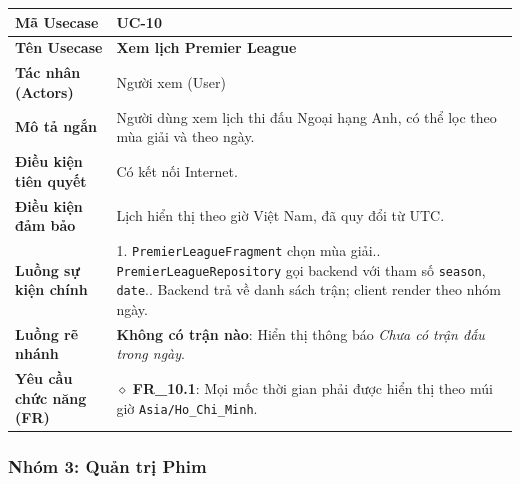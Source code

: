 \begin{table}[H]
\renewcommand{\arraystretch}{1.3}
\centering
\begin{tabularx}{\textwidth}{|p{4.5cm}|X|}
\hline
\cellcolor{gray!15}\bfseries Mã Usecase & \textbf{UC-10} \\ \hline
\cellcolor{gray!15}\bfseries Tên Usecase & \textbf{Xem lịch Premier League} \\ \hline
\cellcolor{gray!15}\bfseries Tác nhân (Actors) & Người xem (User) \\ \hline
\cellcolor{gray!15}\bfseries Mô tả ngắn & Người dùng xem lịch thi đấu Ngoại hạng Anh, có thể lọc theo mùa giải và theo ngày. \\ \hline
\cellcolor{gray!15}\bfseries Điều kiện tiên quyết & Có kết nối Internet. \\ \hline
\cellcolor{gray!15}\bfseries Điều kiện đảm bảo & Lịch hiển thị theo giờ Việt Nam, đã quy đổi từ UTC. \\ \hline
\cellcolor{gray!15}\bfseries Luồng sự kiện chính & 1. \texttt{PremierLeagueFragment} chọn mùa giải.\newline 2. \texttt{PremierLeagueRepository} gọi backend với tham số \texttt{season}, \texttt{date}.\newline 3. Backend trả về danh sách trận; client render theo nhóm ngày. \\ \hline
\cellcolor{gray!15}\bfseries Luồng rẽ nhánh & \textbf{Không có trận nào}: Hiển thị thông báo \textit{Chưa có trận đấu trong ngày}. \\ \hline
\cellcolor{gray!15}\bfseries Yêu cầu chức năng (FR) & $\diamond$ \textbf{FR\_10.1}: Mọi mốc thời gian phải được hiển thị theo múi giờ \texttt{Asia/Ho\_Chi\_Minh}. \\ \hline
\end{tabularx}
\end{table}


\subsubsection*{Nhóm 3: Quản trị Phim}

